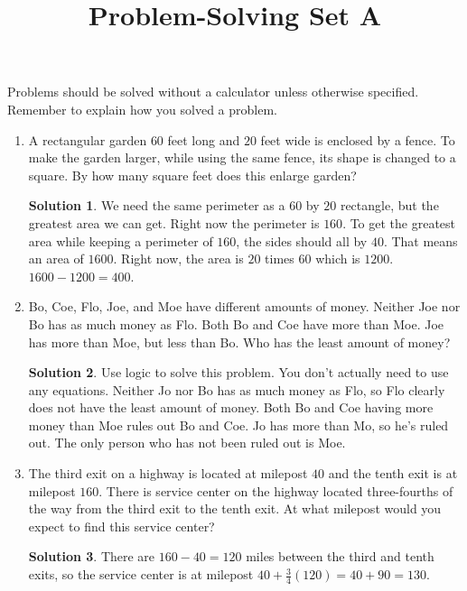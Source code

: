 \documentclass{article}
\title{Problem-Solving Set A}
\author{}
\date{}
\theoremstyle{definition}
\newtheorem*{solution}{Solution}
\begin{document}
\maketitle
\noindent Problems should be solved without a calculator unless otherwise specified.
Remember to explain how you solved a problem.
\begin{multicols}{2}
    \begin{enumerate}
        \item A rectangular garden $60$ feet long and $20$ feet wide is enclosed by a fence.
            To make the garden larger, while using the same fence, its shape is changed to a square.
            By how many square feet does this enlarge garden?
            \begin{solution}
                We need the same perimeter as a $60$ by $20$ rectangle, but the greatest area we can get.
                Right now the perimeter is $160$.
                To get the greatest area while keeping a perimeter of $160$, the sides should all by $40$.
                That means an area of $1600$.
                Right now, the area is $20$ times $60$ which is $1200$.
                $1600 - 1200 = 400$.
            \end{solution}
        \item Bo, Coe, Flo, Joe, and Moe have different amounts of money.
            Neither Joe nor Bo has as much money as Flo.
            Both Bo and Coe have more than Moe.
            Joe has more than Moe, but less than Bo.
            Who has the least amount of money?
            \begin{solution}
                Use logic to solve this problem.
                You don't actually need to use any equations.
                Neither Jo nor Bo has as much money as Flo, so Flo clearly does not have the least amount of money.
                Both Bo and Coe having more money than Moe rules out Bo and Coe.
                Jo has more than Mo, so he's ruled out.
                The only person who has not been ruled out is Moe.
            \end{solution}
        \item The third exit on a highway is located at milepost $40$ and the tenth exit is at milepost $160$.
            There is service center on the highway located three-fourths of the way from the third exit to the tenth exit.
            At what milepost would you expect to find this service center?
            \begin{solution}
                There are $160 - 40 = 120$ miles between the third and tenth exits, so the service center is at milepost $40 + \frac{3}{4} (120) = 40 + 90 = 130$.

\end{solution}
\end{enumerate}
\end{multicols}
\end{document}
